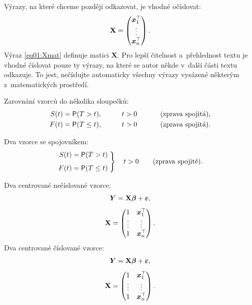 Výrazy, na které chceme později odkazovat, je vhodné očíslovat:
\begin{equation}\label{eq01:Xmat}
\mathbf{X} = \begin{pmatrix}
      \bm x_1^\top \\
      \vdots \\
      \bm x_n^\top
      \end{pmatrix}.
\end{equation}
Výraz \eqref{eq01:Xmat} definuje matici $\mathbf{X}$. Pro lepší čitelnost
a~přehlednost textu je vhodné číslovat pouze ty výrazy, na které se
autor někde v~další části textu odkazuje. To jest, nečíslujte
automaticky všechny výrazy vysázené některým z~matematických
prostředí.

Zarovnání vzorců do několika sloupečků:
\begin{alignat*}{3}
S(t) &= \operatorname{\textsf{P}}(T > t),    &\qquad t&>0       &\qquad&\text{ (zprava spojitá),}\\
F(t) &= \operatorname{\textsf{P}}(T \leq t), &\qquad t&>0       &\qquad&\text{ (zprava spojitá).}
\end{alignat*}

Dva vzorce se spojovníkem:
\begin{equation}\label{eq01:FS}
\left.
\begin{aligned}
S(t) &= \pr(T > t) \\[1ex]
F(t) &= \pr(T \leq t)
\end{aligned}
\;	%
\right\}
\quad t>0 \qquad \text{(zprava spojité).}
\end{equation}

Dva centrované nečíslované vzorce:
\begin{gather*}
\bm Y = \mathbf{X}\bm\beta + \bm\varepsilon, \\[1ex]
\mathbf{X} = \begin{pmatrix} 1 & \bm x_1^\top \\ \vdots & \vdots \\ 1 &
  \bm x_n^\top \end{pmatrix}.
\end{gather*}
Dva centrované číslované vzorce:
\begin{gather}
\bm Y = \mathbf{X}\bm\beta + \bm\varepsilon, \label{eq02:Y}\\[1ex]
\mathbf{X} = \begin{pmatrix} 1 & \bm x_1^\top \label{eq03:X}\\ \vdots & \vdots \\ 1 &
  \bm x_n^\top \end{pmatrix}.
\end{gather}

